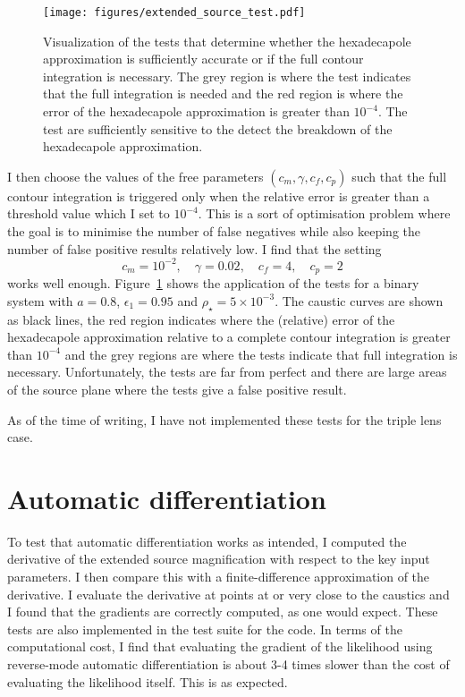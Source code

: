 \documentclass[12pt,dvipsnames]{report}
\begin{document}
\begin{figure}[t]
    \begin{centering}
        \texttt{[image: figures/extended\_source\_test.pdf]}
        \caption{
            Visualization of the tests that determine whether the 
            hexadecapole approximation is sufficiently accurate or if the full contour 
            integration is necessary. The grey region is where the test indicates 
            that the full integration is needed and the red region is where the 
            error of the hexadecapole approximation is greater than $10^{-4}$.
            The test are sufficiently sensitive to the detect the breakdown of the 
            hexadecapole approximation.
            }
            \label{fig:extended_source_test}
    \end{centering}
\end{figure}

I then choose the values of the free parameters $(c_m, \gamma, c_f, c_p)$ such that the 
full contour integration is triggered only when the relative error is greater than a threshold 
value which I set to $10^{-4}$. This is a sort of optimisation problem where the goal is to minimise
the number of false negatives while also keeping the number of false positive results 
relatively low. I find that the setting 
\begin{equation}
    c_m=10^{-2},\quad \gamma=0.02,\quad c_f=4, \quad c_p=2
\end{equation}
works well enough. Figure~\ref{fig:extended_source_test} shows the application of the tests for a binary 
system with $a=0.8$, $\epsilon_1=0.95$ and $\rho_\star=5\times 10^{-3}$. The caustic 
curves are shown as black lines, the red region indicates where the (relative) error of 
the hexadecapole approximation relative to a complete contour integration is greater than 
$10^{-4}$ and the grey regions are where the tests indicate that full integration is 
necessary. Unfortunately, the tests are far from perfect and there are large areas of the 
source plane where the tests give a false positive result. 

As of the time of writing, I have not implemented these tests for the triple lens case.

\section{Automatic differentiation}
\label{sec:caustics_autodiff}
To test that automatic differentiation works as intended, I computed the derivative 
of the extended source magnification with respect to the key input parameters. 
I then compare this with a finite-difference approximation of the derivative.
I evaluate the derivative at points at or very close to the caustics and I found 
that the gradients are correctly computed, as one would expect. These tests 
are also implemented in the test suite for the code. 
In terms of the computational cost, I find that evaluating the gradient of the likelihood
using reverse-mode automatic differentiation is about 3-4 times slower than the 
cost of evaluating the likelihood itself. This is as expected.
\end{document}
